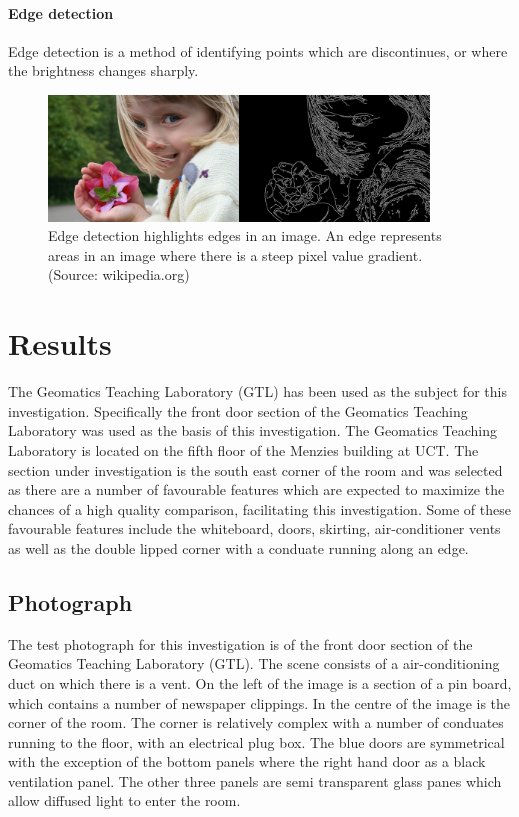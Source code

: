 \documentclass[11pt,a4paper]{report}
\begin{document}
			\subsubsection{Edge detection}
				Edge detection is a method of identifying points which are discontinues, or where the brightness changes sharply.
				\begin{figure}[H]
					\centering
					\includegraphics[width=0.9\textwidth]{edge_detection}
					\caption[Edge detection]{Edge detection highlights edges in an image. An edge represents areas in an image where there is a steep pixel value gradient. (Source: wikipedia.org)}
					\label{fig:edge_detection}
				\end{figure}

\chapter{Results}
	The Geomatics Teaching Laboratory (GTL) has been used as the subject for this investigation. Specifically the front door section of the Geomatics Teaching Laboratory was used as the basis of this investigation. The Geomatics Teaching Laboratory is located on the fifth floor of the Menzies building at UCT. The section under investigation is the south east corner of the room and was selected as there are a number of favourable features which are expected to maximize the chances of a high quality comparison, facilitating this investigation. Some of these favourable features include the whiteboard, doors, skirting, air-conditioner vents as well as the double lipped corner with a conduate running along an edge.
	
	\section{Photograph}
		The test photograph for this investigation is of the front door section of the Geomatics Teaching Laboratory (GTL). The scene consists of a air-conditioning duct on which there is a vent. On the left of the image is a section of a pin board, which contains a number of newspaper clippings. In the centre of the image is the corner of the room. The corner is relatively complex with a number of conduates running to the floor, with an electrical plug box. The blue doors are symmetrical with the exception of the bottom panels where the right hand door as a black ventilation panel. The other three panels are semi transparent glass panes which allow diffused light to enter the room.
		
\end{document}
